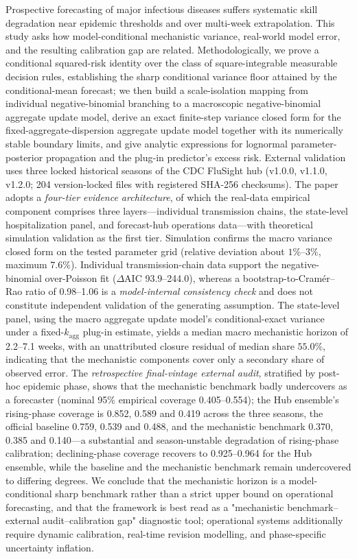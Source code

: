 \documentclass[10pt,a4paper]{article}
\theoremstyle{plain}
\theoremstyle{definition}
\begin{document}
 Prospective forecasting of major infectious diseases suffers systematic skill degradation near epidemic thresholds and over multi-week extrapolation. This study asks how model-conditional mechanistic variance, real-world model error, and the resulting calibration gap are related. Methodologically, we prove a conditional squared-risk identity over the class of square-integrable measurable decision rules, establishing the sharp conditional variance floor attained by the conditional-mean forecast; we then build a scale-isolation mapping from individual negative-binomial branching to a macroscopic negative-binomial aggregate update model, derive an exact finite-step variance closed form for the fixed-aggregate-dispersion aggregate update model together with its numerically stable boundary limits, and give analytic expressions for lognormal parameter-posterior propagation and the plug-in predictor's excess risk. External validation uses three locked historical seasons of the CDC FluSight hub (v1.0.0, v1.1.0, v1.2.0; 204 version-locked files with registered SHA-256 checksums). The paper adopts a \emph{four-tier evidence architecture}, of which the real-data empirical component comprises three layers---individual transmission chains, the state-level hospitalization panel, and forecast-hub operations data---with theoretical simulation validation as the first tier. Simulation confirms the macro variance closed form on the tested parameter grid (relative deviation about $1\%$--$3\%$, maximum $7.6\%$). Individual transmission-chain data support the negative-binomial over-Poisson fit ($\Delta\text{AIC}$ 93.9--244.0), whereas a bootstrap-to-Cramér--Rao ratio of 0.98--1.06 is a \emph{model-internal consistency check} and does not constitute independent validation of the generating assumption. The state-level panel, using the macro aggregate update model's conditional-exact variance under a fixed-$k_{\text{agg}}$ plug-in estimate, yields a median macro mechanistic horizon of 2.2--7.1 weeks, with an unattributed closure residual of median share $55.0\%$, indicating that the mechanistic components cover only a secondary share of observed error. The \emph{retrospective final-vintage external audit}, stratified by post-hoc epidemic phase, shows that the mechanistic benchmark badly undercovers as a forecaster (nominal 95\% empirical coverage 0.405--0.554); the Hub ensemble's rising-phase coverage is 0.852, 0.589 and 0.419 across the three seasons, the official baseline 0.759, 0.539 and 0.488, and the mechanistic benchmark 0.370, 0.385 and 0.140---a substantial and season-unstable degradation of rising-phase calibration; declining-phase coverage recovers to 0.925--0.964 for the Hub ensemble, while the baseline and the mechanistic benchmark remain undercovered to differing degrees. We conclude that the mechanistic horizon is a model-conditional sharp benchmark rather than a strict upper bound on operational forecasting, and that the framework is best read as a "mechanistic benchmark--external audit--calibration gap" diagnostic tool; operational systems additionally require dynamic calibration, real-time revision modelling, and phase-specific uncertainty inflation.
\end{document}
